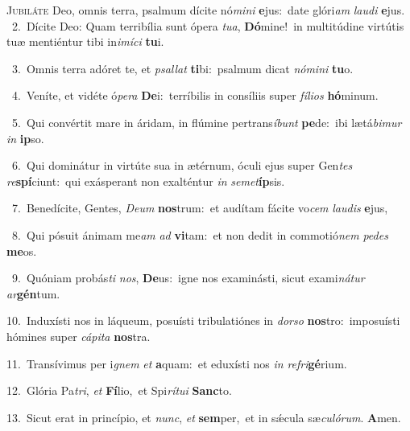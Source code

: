 \lettrine{\initial\textcolor{\initialcolor}{J}}{ubiláte} Deo, omnis terra, psalmum dícite nó\-\textit{mi}\-\textit{ni} \textbf{e}\-jus:~\star date glóri\textit{am} \textit{lau}\-\textit{di} \textbf{e}\-jus.\\
{\numbfont\textcolor{\numbcolor}{~2.}}~Dícite Deo: Quam terribília sunt ópera \textit{tu}\-\textit{a}, \textbf{Dó}\-mine!~\star in multitúdine virtútis tuæ mentiéntur tibi in\-\textit{i}\-\textit{mí}\textit{ci} \textbf{tu}\-i.\par
{\numbfont\textcolor{\numbcolor}{~3.}}~Omnis terra adóret te, et \textit{psal}\-\textit{lat} \textbf{ti}\-bi:~\star psalmum dicat \textit{nó}\-\textit{mi}\textit{ni} \textbf{tu}\-o.\par
{\numbfont\textcolor{\numbcolor}{~4.}}~Veníte, et vidéte ó\-\textit{pe}\-\textit{ra} \textbf{De}\-i:~\star terríbilis in consíliis super \textit{fí}\-\textit{li}\textit{os} \textbf{hó}\-minum.\par
{\numbfont\textcolor{\numbcolor}{~5.}}~Qui convértit mare in áridam, in flúmine pertrans\-\textit{í}\-\textit{bunt} \textbf{pe}\-de:~\star ibi lætá\-\textit{bi}\-\textit{mur} \textit{in} \textbf{ip}\-so.\par
{\numbfont\textcolor{\numbcolor}{~6.}}~Qui dominátur in virtúte sua in ætérnum, óculi ejus super Gen\textit{tes} \textit{re}\-\textbf{spí}ciunt:~\star qui exásperant non exalténtur \textit{in} \textit{se}\-\textit{met}\textbf{íp}sis.\par
{\numbfont\textcolor{\numbcolor}{~7.}}~Benedícite, Gentes, \textit{De}\-\textit{um} \textbf{nos}\-trum:~\star et audítam fácite vo\textit{cem} \textit{lau}\-\textit{dis} \textbf{e}\-jus,\par
{\numbfont\textcolor{\numbcolor}{~8.}}~Qui pósuit ánimam me\textit{am} \textit{ad} \textbf{vi}\-tam:~\star et non dedit in commotió\textit{nem} \textit{pe}\-\textit{des} \textbf{me}\-os.\par
{\numbfont\textcolor{\numbcolor}{~9.}}~Quóniam probás\textit{ti} \textit{nos}\-, \textbf{De}\-us:~\star igne nos examinásti, sicut exami\-\textit{ná}\-\textit{tur} \textit{ar}\-\textbf{gén}tum.\par
{\numbfont\textcolor{\numbcolor}{10.}}~Induxísti nos in láqueum, posuísti tribulatiónes in \textit{dor}\-\textit{so} \textbf{nos}\-tro:~\star imposuísti hómines super \textit{cá}\-\textit{pi}\textit{ta} \textbf{nos}\-tra.\par
{\numbfont\textcolor{\numbcolor}{11.}}~Transívimus per i\textit{gnem} \textit{et} \textbf{a}\-quam:~\star et eduxísti nos \textit{in} \textit{re}\-\textit{fri}\textbf{gé}rium.\par
{\numbfont\textcolor{\numbcolor}{12.}}~Glória Pa\-\textit{tri}\-, \textit{et} \textbf{Fí}\-lio,~\star et Spi\-\textit{rí}\-\textit{tu}\textit{i} \textbf{Sanc}\-to.\par
{\numbfont\textcolor{\numbcolor}{13.}}~Sicut erat in princípio, et \textit{nunc}\-, \textit{et} \textbf{sem}\-per,~\star et in sǽcula sæ\-\textit{cu}\-\textit{ló}\textit{rum}. \textbf{A}\-men.\par

